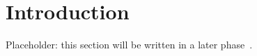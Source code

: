 \section{Introduction}\label{sec:introduction}

Placeholder: this section will be written in a later phase~\cite{IEC61131-3}.
